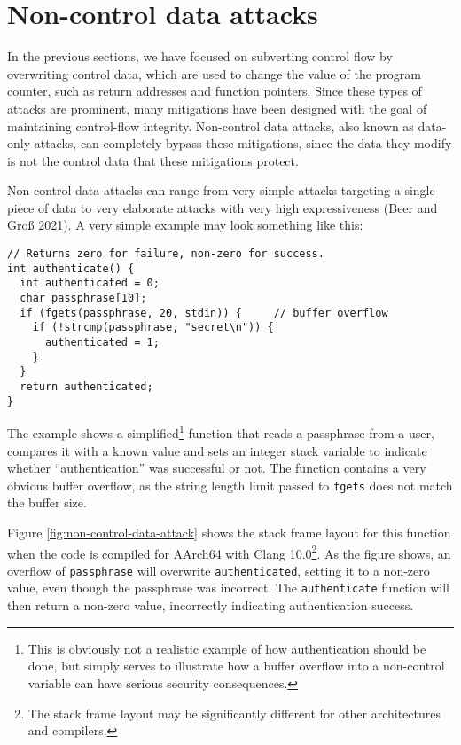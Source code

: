 \documentclass[a4paper,]{report}
\begin{document}
\hypertarget{non-control-data-attacks}{%
\section{Non-control data attacks}\label{non-control-data-attacks}}

In the previous sections, we have focused on subverting control flow by
overwriting control data, which are used to change
the value of the program counter, such as return addresses and function
pointers. Since these types of attacks are prominent, many mitigations
have been designed with the goal of maintaining control-flow integrity.
Non-control data attacks, also known as
data-only attacks, can completely bypass these
mitigations, since the data they modify is not the control data that
these mitigations protect.

Non-control data attacks can range from very simple attacks targeting a
single piece of data to very elaborate attacks with very high
expressiveness (Beer and Groß \protect\hyperlink{ref-Beer2021}{2021}). A
very simple example may look something like this:

\begin{verbatim}
// Returns zero for failure, non-zero for success.
int authenticate() {
  int authenticated = 0;
  char passphrase[10];
  if (fgets(passphrase, 20, stdin)) {     // buffer overflow
    if (!strcmp(passphrase, "secret\n")) {
      authenticated = 1;
    }
  }
  return authenticated;
}
\end{verbatim}

The example shows a simplified\footnote{This is obviously not a
  realistic example of how authentication should be done, but simply
  serves to illustrate how a buffer overflow into a non-control variable
  can have serious security consequences.} function that reads a
passphrase from a user, compares it with a known value and sets an
integer stack variable to indicate whether ``authentication'' was
successful or not. The function contains a very obvious buffer overflow,
as the string length limit passed to \texttt{fgets} does not match the
buffer size.

Figure \ref{fig:non-control-data-attack} shows the stack frame layout
for this function when the code is compiled for AArch64 with Clang
10.0\footnote{The stack frame layout may be significantly different for
  other architectures and compilers.}. As the figure shows, an overflow
of \texttt{passphrase} will overwrite \texttt{authenticated}, setting it
to a non-zero value, even though the passphrase was incorrect. The
\texttt{authenticate} function will then return a non-zero value,
incorrectly indicating authentication success.
\end{document}
